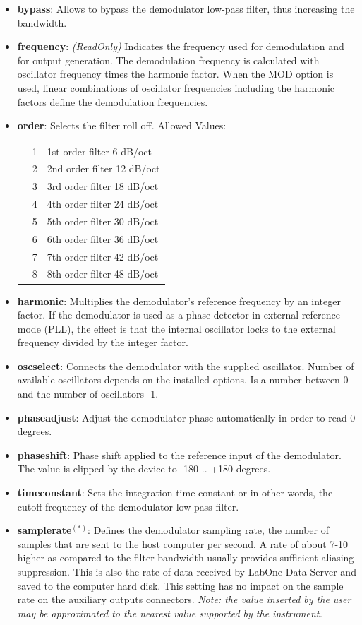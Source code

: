 \documentclass[11pt]{article} %
\begin{document}
	\begin{itemize}
	\item {\bf bypass}: Allows to bypass the demodulator low-pass filter, thus increasing the bandwidth.
	\item {\bf frequency}: {\it (ReadOnly)} Indicates the frequency used for demodulation and for output generation. The demodulation frequency is calculated with oscillator frequency times the harmonic factor. When the MOD option is used, linear combinations of oscillator frequencies including the harmonic factors define the demodulation frequencies.
	\item {\bf order}: Selects the filter roll off. Allowed Values:
	\begin{longtable}{p{1.5cm}p{1cm}p{14cm}}
	& 1 & 1st order filter 6 dB/oct \\
	& 2 & 2nd order filter 12 dB/oct \\
	& 3 & 3rd order filter 18 dB/oct \\
	& 4 & 4th order filter 24 dB/oct \\
	& 5 & 5th order filter 30 dB/oct \\
	& 6 & 6th order filter 36 dB/oct \\
	& 7 & 7th order filter 42 dB/oct \\
	& 8 & 8th order filter 48 dB/oct \\
	\end{longtable}
	\item {\bf harmonic}: Multiplies the demodulator's reference frequency by an integer factor. If the demodulator is used as a phase detector in external reference mode (PLL), the effect is that the internal oscillator locks to the external frequency divided by the integer factor.
	\item {\bf oscselect}: Connects the demodulator with the supplied oscillator. Number of available oscillators depends on the installed options. Is a number between 0 and the number of oscillators -1.
	\item {\bf phaseadjust}: Adjust the demodulator phase automatically in order to read 0 degrees.
	\item {\bf phaseshift}: Phase shift applied to the reference input of the demodulator. The value is clipped by the device to -180 .. +180 degrees.
	\item {\bf timeconstant}: Sets the integration time constant or in other words, the cutoff frequency of the demodulator low pass filter.
	\item {\bf samplerate}$^{(*)}$: Defines the demodulator sampling rate, the number of samples that are sent to the host computer per second. A rate of about 7-10 higher as compared to the filter bandwidth usually provides sufficient aliasing suppression. This is also the rate of data received by LabOne Data Server and saved to the computer hard disk. This setting has no impact on the sample rate on the auxiliary outputs connectors. {\it Note: the value inserted by the user may be approximated to the nearest value supported by the instrument.}

\end{itemize}
\end{document}
